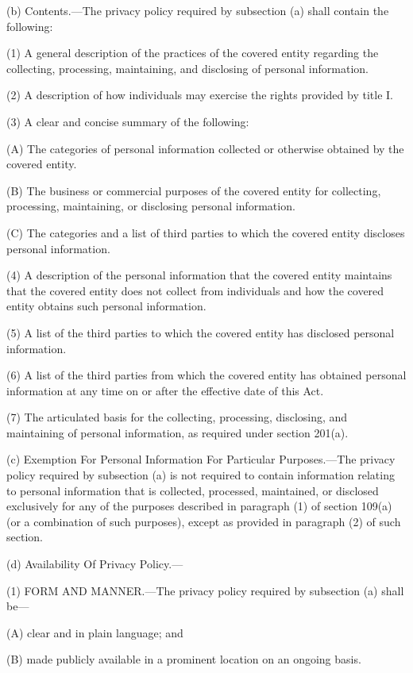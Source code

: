 (b) Contents.—The privacy policy required by subsection (a) shall contain the following:

(1) A general description of the practices of the covered entity regarding the collecting, processing, maintaining, and disclosing of personal information.

(2) A description of how individuals may exercise the rights provided by title I.

(3) A clear and concise summary of the following:

(A) The categories of personal information collected or otherwise obtained by the covered entity.

(B) The business or commercial purposes of the covered entity for collecting, processing, maintaining, or disclosing personal information.

(C) The categories and a list of third parties to which the covered entity discloses personal information.

(4) A description of the personal information that the covered entity maintains that the covered entity does not collect from individuals and how the covered entity obtains such personal information.

(5) A list of the third parties to which the covered entity has disclosed personal information.

(6) A list of the third parties from which the covered entity has obtained personal information at any time on or after the effective date of this Act.

(7) The articulated basis for the collecting, processing, disclosing, and maintaining of personal information, as required under section 201(a).

(c) Exemption For Personal Information For Particular Purposes.—The privacy policy required by subsection (a) is not required to contain information relating to personal information that is collected, processed, maintained, or disclosed exclusively for any of the purposes described in paragraph (1) of section 109(a) (or a combination of such purposes), except as provided in paragraph (2) of such section.

(d) Availability Of Privacy Policy.—

(1) FORM AND MANNER.—The privacy policy required by subsection (a) shall be—

(A) clear and in plain language; and

(B) made publicly available in a prominent location on an ongoing basis.

